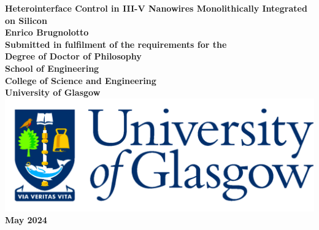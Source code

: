 \documentclass[11pt,titlepage,twoside,openright]{book} %
\begin{document}
\begin{titlepage}
\centering
\vspace*{3cm}  %
\bfseries\Large
Heterointerface Control in III-V Nanowires Monolithically Integrated on Silicon\\
\vspace{3cm}
\normalfont\large
Enrico Brugnolotto\\
\vspace{2cm}
Submitted in fulfilment of the requirements for the\\
Degree of Doctor of Philosophy\\
\vspace{2cm}
School of Engineering\\
College of Science and Engineering\\
University of Glasgow\\
\vspace{1cm}
\includegraphics[scale=0.125]{GlaLogo.pdf}
\\
\vspace{1cm}
May 2024
\end{titlepage}
\frontmatter  %

\tableofcontents
\listoftables
\listoffigures
\printglossaries





\mainmatter %








\appendix


\backmatter  %

\printbibliography
\end{document}
